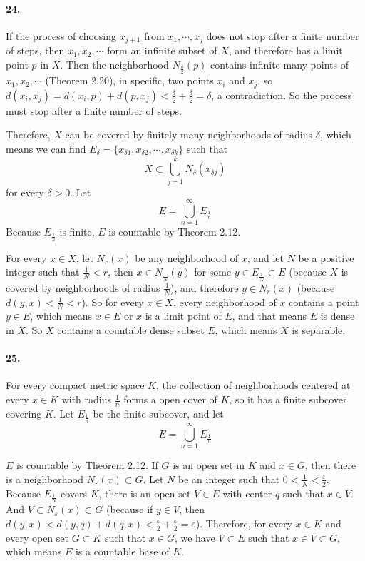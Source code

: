 \documentclass[a4paper]{article}
\begin{document}
\paragraph{24.}
If the process of choosing $x_{j+1}$ from $x_1,\cdots,x_j$ does not stop after a finite number of steps, then $x_1,x_2,\cdots$ form an infinite subset of $X$, and therefore has a limit point $p$ in $X$. Then the neighborhood $N_{\frac{\delta}{2}}(p)$ contains infinite many points of $x_1,x_2,\cdots$ (Theorem 2.20), in specific, two points $x_i$ and $x_j$, so $d(x_i,x_j)=d(x_i,p)+d(p,x_j)<\frac{\delta}{2}+\frac{\delta}{2}=\delta$, a contradiction. So the process must stop after a finite number of steps. 

Therefore, $X$ can be covered by finitely many neighborhoods of radius $\delta$, which means we can find $E_\delta=\{x_{\delta1},x_{\delta2},\cdots,x_{\delta k} \}$ such that 
\[
X\subset\bigcup_{j=1}^kN_\delta(x_{\delta j})
\]
for every $\delta>0$. Let 
\[
E=\bigcup_{n=1}^\infty E_{\frac{1}{n}}
\]
Because $E_{\frac{1}{n}}$ is finite, $E$ is countable by Theorem 2.12. 

For every $x\in X$, let $N_r(x)$ be any neighborhood of $x$, and let $N$ be a positive integer such that $\frac{1}{N}<r$, then $x\in N_{\frac{1}{N}}(y)$ for some $y\in E_{\frac{1}{N}}\subset E$ (because $X$ is covered by neighborhoods of radius $\frac{1}{N}$), and therefore $y\in N_r(x)$ (because $d(y,x)<\frac{1}{N}<r$). So for every $x\in X$, every neighborhood of $x$ contains a point $y\in E$, which means  $x\in E$ or $x$ is a limit point of $E$, and that means $E$ is dense in $X$. So $X$ contains a countable dense subset $E$, which means $X$ is separable.

\paragraph{25.}
For every compact metric space $K$, the collection of neighborhoods centered at every $x\in K$ with radius $\frac{1}{n}$ forms a open cover of $K$, so it has a finite subcover covering $K$. Let $E_{\frac{1}{n}}$ be the finite subcover, and let 
\[
E=\bigcup_{n=1}^\infty E_{\frac{1}{n}}
\]

$E$ is countable by Theorem 2.12. If $G$ is an open set in $K$ and $x\in G$, then there is a neighborhood $N_\varepsilon(x)\subset G$. Let $N$ be an integer such that $0<\frac{1}{N}<\frac{\varepsilon}{2}$. Because $E_{\frac{1}{N}}$ covers $K$, there is an open set $V\in E$ with center $q$ such that $x\in V$. And $V\subset N_{\varepsilon}(x)\subset G$ (because if $y\in V$, then $d(y,x)<d(y,q)+d(q,x)<\frac{\varepsilon}{2}+\frac{\varepsilon}{2}=\varepsilon$). Therefore, for every $x\in K$ and every open set $G\subset K$ such that $x\in G$, we have $V\subset E$ such that $x\in V\subset G$, which means $E$ is a countable base of $K$.
\end{document}
